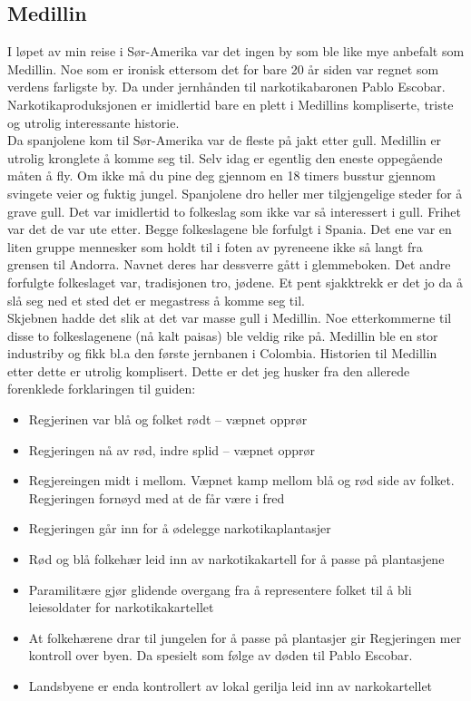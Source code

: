 \subsection{Medillin}
I løpet av min reise i Sør-Amerika var det ingen by som ble like mye
anbefalt som Medillin. Noe som er ironisk ettersom det for bare 20 år
siden var regnet som verdens farligste by. Da under jernhånden til
narkotikabaronen Pablo Escobar. Narkotikaproduksjonen er imidlertid
bare en plett i Medillins kompliserte, triste og utrolig interessante
historie.  \\

Da spanjolene kom til Sør-Amerika var de fleste på jakt etter gull.
Medillin er utrolig kronglete å komme seg til. Selv idag er egentlig
den eneste oppegående måten å fly. Om ikke må du
pine deg gjennom en 18 timers busstur gjennom svingete veier og fuktig
jungel. Spanjolene dro heller mer tilgjengelige steder for å grave
gull. Det var imidlertid to folkeslag som ikke var så interessert i
gull. Frihet var det de var ute etter. Begge folkeslagene ble
forfulgt i Spania. Det ene var en liten gruppe mennesker som holdt
til i foten av pyreneene ikke så langt fra grensen til Andorra. Navnet deres har dessverre gått i
glemmeboken. Det andre forfulgte folkeslaget var, tradisjonen tro,
jødene. Et pent sjakktrekk er det jo da å slå seg ned et sted det er
megastress å komme seg
til.\\

Skjebnen hadde det slik at det var masse gull i Medillin. Noe
etterkommerne til disse to folkeslagenene (nå kalt paisas) ble veldig
rike på. Medillin ble en stor industriby og fikk bl.a den første
jernbanen i Colombia. Historien til Medillin etter dette er utrolig
komplisert. Dette er det jeg husker fra den allerede forenklede
forklaringen til guiden:

\begin{itemize}
	\item Regjerinen var blå og folket rødt -- væpnet opprør
	\item Regjeringen nå av rød, indre splid -- væpnet opprør
	\item Regjereingen midt i mellom. Væpnet kamp mellom blå og
		rød side av folket. Regjeringen fornøyd med at de får
		være i fred
	\item Regjeringen går inn for å ødelegge narkotikaplantasjer
	\item Rød og blå folkehær leid inn av narkotikakartell for å
		passe på plantasjene
	\item Paramilitære gjør glidende overgang fra å representere folket
		til å bli
		leiesoldater for narkotikakartellet
	\item At folkehærene drar til jungelen for å passe på
		plantasjer gir Regjeringen mer kontroll over byen. Da
		spesielt som følge av døden til Pablo Escobar.
	\item Landsbyene er enda kontrollert av lokal gerilja leid inn
		av narkokartellet

	
\end{itemize}

